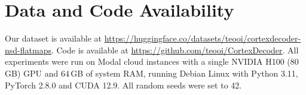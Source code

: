 \documentclass[conference]{IEEEtran}
\begin{document}
\clearpage
\section{Data and Code Availability}
\label{app:datacode}
Our dataset is available at \url{https://huggingface.co/datasets/teooi/cortexdecoder-nsd-flatmaps}. Code is available at \url{https://github.com/teooi/CortexDecoder}. All experiments were run on Modal cloud instances with a single NVIDIA H100 (80\,GB) GPU and 64\,GB of system RAM, running Debian Linux with Python 3.11, PyTorch 2.8.0 and CUDA 12.9. All random seeds were set to 42.
\end{document}
